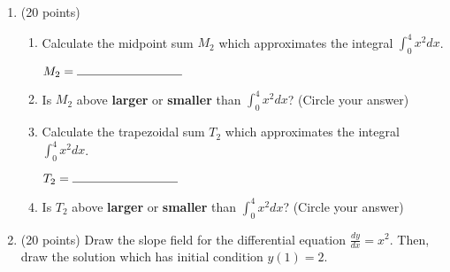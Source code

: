 \documentclass[11pt]{article}
\begin{document}
\begin{enumerate}
\item (20 points) 
\begin{enumerate}[itemsep=10pt]
	\item Calculate the midpoint sum $M_{2}$ which approximates the integral $\int_{0}^{4} x^2dx$. 
\vspace{200pt}
\begin{flushright}
$M_2 = \rule{3cm}{0.4pt}$
\end{flushright}
\vspace{20pt}
	\item Is $M_2$ above \textbf{larger} or \textbf{smaller} than $\int_{0}^{4} x^2dx$? (Circle your answer)
	\item Calculate the trapezoidal sum $T_{2}$ which approximates the integral $\int_{0}^{4} x^2dx$. 
\vspace{200pt}
\begin{flushright}
$T_2 = \rule{3cm}{0.4pt}$
\end{flushright}
\vspace{20pt}
	\item Is $T_2$ above \textbf{larger} or \textbf{smaller} than $\int_{0}^{4} x^2dx$? (Circle your answer)
\end{enumerate}
\vspace{20pt}

\newpage

\item (20 points) Draw the slope field for the differential equation $\frac{dy}{dx} = x^2$. Then, draw the solution which has initial condition $y(1) = 2$.

\begin{center}
\end{center}

\end{enumerate}
\end{document}
